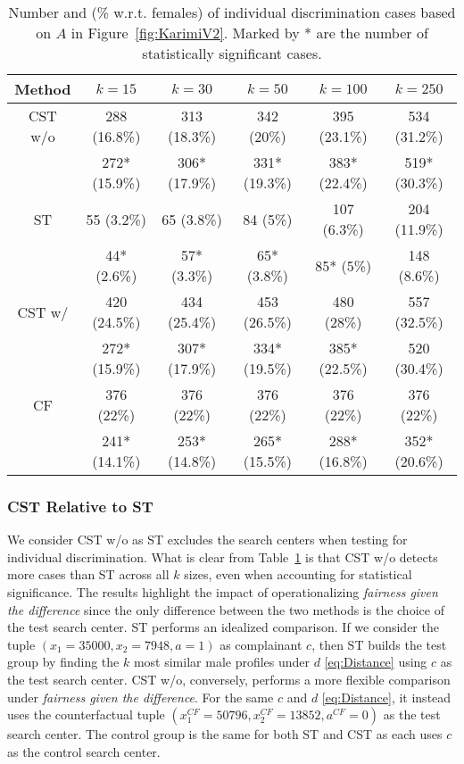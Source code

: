 %
\begin{table}[t]
\caption{Number and (\% w.r.t. females) of individual discrimination cases based on $A$ in Figure~\ref{fig:KarimiV2}. Marked by * are the number of statistically significant cases.}
  \label{table:k-results}
  \centering
  \begin{tabular}{cccccc}
    \toprule
    Method & $k=15$ & $k=30$ & $k=50$ & $k=100$ & $k=250$\\
    \midrule
    CST w/o & 288 (16.8\%) & 313 (18.3\%) & 342 (20\%) & 395 (23.1\%)  & 534 (31.2\%) \\
     & 272* (15.9\%) & 306* (17.9\%) & 331* (19.3\%) & 383* (22.4\%)  & 519* (30.3\%) \\
     \midrule
    ST & 55 (3.2\%) & 65 (3.8\%) & 84 (5\%) & 107 (6.3\%) & 204 (11.9\%) \\
    & 44* (2.6\%) & 57* (3.3\%) & 65* (3.8\%) & 85* (5\%) & 148 (8.6\%) \\
    \midrule
    CST w/ & 420 (24.5\%) & 434 (25.4\%) & 453 (26.5\%) & 480 (28\%)  & 557 (32.5\%)\\
    & 272* (15.9\%) & 307* (17.9\%) & 334* (19.5\%) & 385* (22.5\%)  & 520 (30.4\%)\\
    \midrule
    CF &  376 (22\%) &  376 (22\%) &  376 (22\%) & 376 (22\%)  & 376 (22\%) \\
    & 241* (14.1\%) &  253* (14.8\%) & 265* (15.5\%) & 288* (16.8\%)  & 352* (20.6\%) \\
    \bottomrule
  \end{tabular}
\end{table}
%

\subsubsection{CST Relative to ST}
\label{sec:Experiments.IllustrativeExample.CSTvST}

We consider CST w/o as ST excludes the search centers when testing for individual discrimination. What is clear from Table~\ref{table:k-results} is that CST w/o detects more cases than ST across all $k$ sizes, even when accounting for statistical significance. The results highlight the impact of operationalizing \textit{fairness given the difference} since the only difference between the two methods is the choice of the test search center. 
ST performs an idealized comparison. If we consider the tuple $(x_1=35000, x_2=7948, a=1)$ as complainant $c$, then ST builds the test group by finding the $k$ most similar male profiles under $d$ \eqref{eq:Distance} using $c$ as the test search center. CST w/o, conversely, performs a more flexible comparison under \textit{fairness given the difference}. For the same $c$ and $d$ \eqref{eq:Distance}, it instead uses the counterfactual tuple $(x_1^{CF}=50796, x_2^{CF}=13852, a^{CF}=0)$ as the test search center. The control group is the same for both ST and CST as each uses $c$ as the control search center.

